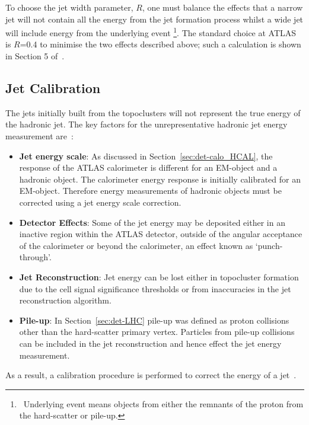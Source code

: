 To choose the jet width parameter, $R$, one must balance the effects that
a narrow jet will not contain all the energy from the jet formation process
whilst a wide jet will include energy from the underlying event \footnote{\  Underlying event means objects from either the remnants of the proton from the hard-scatter or pile-up.}.
The standard choice at ATLAS is $R$=0.4 to minimise the  two effects described above;
such a calculation is shown in Section 5 of~\cite{obj-jets_reco_salam}.


\subsection{Jet Calibration}
\label{sec:obj-jets_calib}

The jets initially built from the topoclusters will not represent the true energy of the hadronic jet.
The key factors for the unrepresentative hadronic jet energy measurement are~\cite{det-thesis_kate,obj-jets_calib_2015}:
\begin{itemize}[leftmargin=*]
\item\textbf{Jet energy scale}:
  As discussed in Section~\ref{sec:det-calo_HCAL}, the response of the ATLAS calorimeter is different for an EM-object and a hadronic object.
  The calorimeter energy response is initially calibrated for an EM-object.
  Therefore energy measurements of hadronic objects must be corrected using a jet energy scale correction. \vspace{0.5em}
\item\textbf{Detector Effects}:
  Some of the jet energy may be deposited either in an inactive region within the ATLAS detector,
  outside of the angular acceptance of the calorimeter or beyond the calorimeter, an effect known as `punch-through'.\vspace{0.5em}
\item\textbf{Jet Reconstruction}:
  Jet energy can be lost either in topocluster formation due to the cell signal significance thresholds
  or from inaccuracies in the jet reconstruction algorithm.\vspace{0.5em}
\item\textbf{Pile-up}:
  In Section~\ref{sec:det-LHC} pile-up was defined as proton collisions other than the hard-scatter primary vertex.
  Particles from pile-up collisions can be included in the jet reconstruction and hence effect the jet energy measurement.
\end{itemize}
\vspace{-0.5em}
As a result, a calibration procedure is performed to correct the energy of a jet~\cite{obj-jets_calib_run2}.

